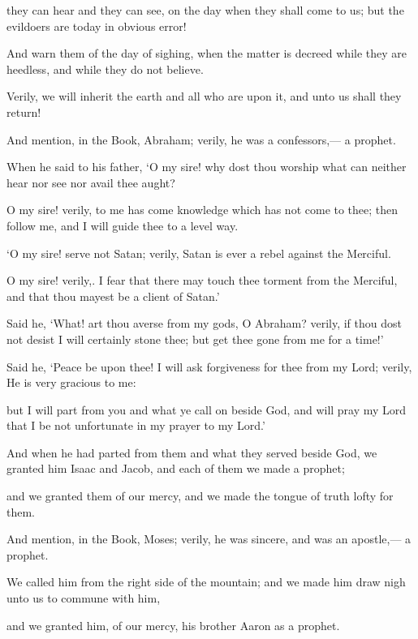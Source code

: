 \documentclass[fontsize=14pt, letterpaper, notitlepage, openany, DIV=12]{scrbook} %
\begin{document}
\noindent[19:38]
they can hear and they can see, on the day when they shall come to us; but the evildoers
are today in obvious error!

\noindent[19:39]
And warn them of the day of sighing, when the matter is decreed while they are heedless,
and while they do not believe.

\noindent[19:40]
Verily, we will inherit the earth and all who are upon it, and unto us shall they return!

\noindent[19:41]
And mention, in the Book, Abraham; verily, he was a confessors,--- a prophet.

\noindent[19:42]
When he said to his father, `O my sire! why dost thou worship what can neither hear nor
see nor avail thee aught?

\noindent[19:43]
O my sire! verily, to me has come knowledge which has not come to thee; then follow
me, and I will guide thee to a level way.

\noindent[19:44]
`O my sire! serve not Satan; verily, Satan is ever a rebel against the Merciful.

\noindent[19:45]
O my sire! verily,. I fear that there may touch thee torment from the Merciful, and that
thou mayest be a client of Satan.'

\noindent[19:46]
Said he, `What! art thou averse from my gods, O Abraham? verily, if thou dost not desist
I will certainly stone thee; but get thee gone from me for a time!'

\noindent[19:47]
Said he, `Peace be upon thee! I will ask forgiveness for thee from my Lord; verily, He is
very gracious to me:

\noindent[19:48]
but I will part from you and what ye call on beside God, and will pray my Lord that I be
not unfortunate in my prayer to my Lord.'

\noindent[19:49]
And when he had parted from them and what they served beside God, we granted him
Isaac and Jacob, and each of them we made a prophet;

\noindent[19:50]
and we granted them of our mercy, and we made the tongue of truth lofty for them.

\noindent[19:51]
And mention, in the Book, Moses; verily, he was sincere, and was an apostle,--- a
prophet.

\noindent[19:52]
We called him from the right side of the mountain; and we made him draw nigh unto us
to commune with him,

\noindent[19:53]
and we granted him, of our mercy, his brother Aaron as a prophet.
\end{document}
